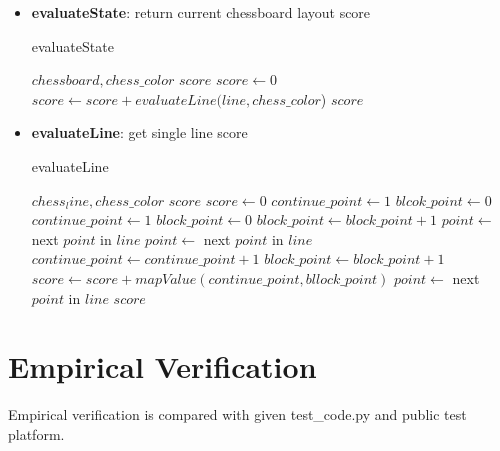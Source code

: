 \documentclass[conference,compsoc]{IEEEtran}
\renewcommand{\algorithmicrequire}{\textbf{Input:}}
\renewcommand{\algorithmicensure}{\textbf{Output:}}
\begin{document}
\begin{itemize}
  \item \textbf{evaluateState}: return current chessboard layout score
    \begin{algorithm}[H]
     \caption{evaluateState}
     \begin{algorithmic}[3]
     \renewcommand{\algorithmicrequire}{\textbf{Input:}}
     \renewcommand{\algorithmicensure}{\textbf{Output:}}
     \REQUIRE $chessboard, chess\_color$
     \ENSURE  $score$
     \STATE $score \leftarrow 0$ 
       \STATE $score \leftarrow score + evaluateLine(line, chess\_color$)
     \ENDFOR
     \RETURN $score$
     \end{algorithmic}
     \end{algorithm}
 
   \item \textbf{evaluateLine}: get single line score
     \begin{algorithm}[H]
     \caption{evaluateLine}
     \begin{algorithmic}[4]
     \renewcommand{\algorithmicrequire}{\textbf{Input:}}
     \renewcommand{\algorithmicensure}{\textbf{Output:}}
     \REQUIRE $chess_line, chess\_color$
     \ENSURE  $score$
     \STATE $score \leftarrow 0$
     \STATE $continue\_point \leftarrow 1$
     \STATE $blcok\_point \leftarrow 0$
         \STATE $continue\_point \leftarrow 1$
         \STATE $block\_point \leftarrow 0$
           \STATE $block\_point \leftarrow block\_point+1$
         \ENDIF
         \STATE $point \leftarrow$ next $point$ in $line$
           \STATE $point \leftarrow$ next $point$ in $line$
           \STATE $continue\_point \leftarrow continue\_point+1$
             \STATE $block\_point \leftarrow block\_point+1$
           \ENDIF
         \ENDWHILE
         \STATE $score \leftarrow score+ mapValue(continue\_point, bllock\_point)$
       \ENDIF
       \STATE $point \leftarrow$ next $point$ in $line$
     \ENDWHILE
     \RETURN $score$
     \end{algorithmic}
     \end{algorithm}

\end{itemize}


\section{Empirical Verification}
Empirical verification is compared with given test\_code.py and public test
platform.
\end{document}
